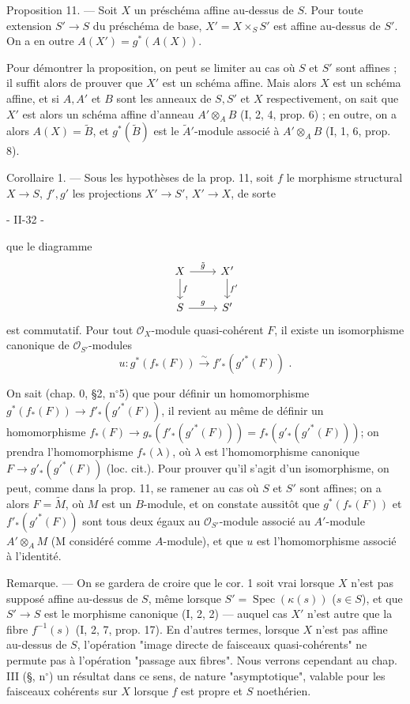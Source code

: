 Proposition 11. — Soit $X$ un préschéma affine au-dessus de $S$. Pour toute extension $S' \to S$ du préschéma de base, $X' = X \times_S S'$ est affine au-dessus de $S'$. On a en outre $A(X') = g^*(A(X))$.

Pour démontrer la proposition, on peut se limiter au cas où $S$ et $S'$ sont affines ; il suffit alors de prouver que $X'$ est un schéma affine. Mais alors $X$ est un schéma affine, et si $A, A'$ et $B$ sont les anneaux de $S, S'$ et $X$ respectivement, on sait que $X'$ est alors un schéma affine d'anneau $A' \otimes_A B$ (I, 2, 4, prop. 6) ; en outre, on a alors $A(X) = \tilde{B}$, et $g^*(\tilde{B})$ est le $\tilde{A}'$-module associé à $A' \otimes_A B$ (I, 1, 6, prop. 8).

Corollaire 1. — Sous les hypothèses de la prop. 11, soit $f$ le morphisme structural $X \to S$, $f', g'$ les projections $X' \to S'$, $X' \to X$, de sorte

\newpage


\begin{center}
- II-32 -
\end{center}

que le diagramme
$$\begin{tikzcd}
X \arrow[d, "f"] \arrow[r, "\tilde{g}"] & X' \arrow[d, "f'"] \\
S \arrow[r, "g"] & S'
\end{tikzcd}$$
est commutatif. Pour tout $\mathcal{O}_X$-module quasi-cohérent $F$, il existe un isomorphisme canonique de $\mathcal{O}_{S'}$-modules
$$u : g^*(f_*(F)) \xrightarrow{\sim} f'_*(g'^*(F)) \text{ .}$$

On sait (chap. 0, \S 2, n$^\circ$5) que pour définir un homomorphisme $g^*(f_*(F)) \to f'_*(g'^*(F))$, il revient au même de définir un homomorphisme $f_*(F) \to g_*(f'_*(g'^*(F))) = f_*(g'_*(g'^*(F)))$; on prendra l'homomorphisme $f_*(\lambda)$, où $\lambda$ est l'homomorphisme canonique $F \to g'_*(g'^*(F))$ (loc. cit.). Pour prouver qu'il s'agit d'un isomorphisme, on peut, comme dans la prop. 11, se ramener au cas où $S$ et $S'$ sont affines; on a alors $F = \widetilde{M}$, où $M$ est un $B$-module, et on constate aussitôt que $g^*(f_*(F))$ et $f'_*(g'^*(F))$ sont tous deux égaux au $\mathcal{O}_{S'}$-module associé au $A'$-module $A' \otimes_A M$ (M considéré comme $A$-module), et que $u$ est l'homomorphisme associé à l'identité.

Remarque. — On se gardera de croire que le cor. 1 soit vrai lorsque $X$ n'est pas supposé affine au-dessus de $S$, même lorsque $S' = \operatorname{Spec}(\kappa(s))$ ($s \in S$), et que $S' \to S$ est le morphisme canonique (I, 2, 2) — auquel cas $X'$ n'est autre que la fibre $f^{-1}(s)$ (I, 2, 7, prop. 17). En d'autres termes, lorsque $X$ n'est pas affine au-dessus de $S$, l'opération "image directe de faisceaux quasi-cohérents" ne permute pas à l'opération "passage aux fibres". Nous verrons cependant au chap. III (\S, n$^\circ$) un résultat dans ce sens, de nature "asymptotique", valable pour les faisceaux cohérents sur $X$ lorsque $f$ est propre et $S$ noethérien.

